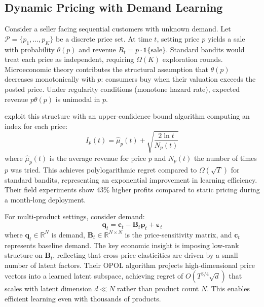 \begin{table}[htbp]
\centering

\caption{Terminal cumulative regret and fraction of plays on the optimal arm at $T = 10{,}000$ for the 10-armed Gaussian bandit. Mean $\pm$ one standard error over 30 seeds.}
\label{tab:bandit_fundamentals}
\end{table}


\subsection{Dynamic Pricing with Demand Learning}
\label{sec:dynamic_pricing}

Consider a seller facing sequential customers with unknown demand. Let $\mathcal{P} = \{p_1, \ldots, p_K\}$ be a discrete price set. At time $t$, setting price $p$ yields a sale with probability $\theta(p)$ and revenue $R_t = p \cdot \mathbb{1}\{\text{sale}\}$. Standard bandits would treat each price as independent, requiring $\Omega(K)$ exploration rounds. Microeconomic theory contributes the structural assumption that $\theta(p)$ decreases monotonically with $p$: consumers buy when their valuation exceeds the posted price. Under regularity conditions (monotone hazard rate), expected revenue $p\theta(p)$ is unimodal in $p$.

\citet{Misra2019} exploit this structure with an upper-confidence bound algorithm computing an index for each price:
\begin{equation}
I_p(t) = \hat{\mu}_p(t) + \sqrt{\frac{2\ln t}{N_p(t)}}
\end{equation}
where $\hat{\mu}_p(t)$ is the average revenue for price $p$ and $N_p(t)$ the number of times $p$ was tried. This achieves polylogarithmic regret compared to $\Omega(\sqrt{T})$ for standard bandits, representing an exponential improvement in learning efficiency. Their field experiments show 43\% higher profits compared to static pricing during a month-long deployment.

For multi-product settings, \citet{Mueller2019} consider demand:
\begin{equation}
\mathbf{q}_t = \mathbf{c}_t - \mathbf{B}_t\mathbf{p}_t + \boldsymbol{\varepsilon}_t
\end{equation}
where $\mathbf{q}_t \in \mathbb{R}^N$ is demand, $\mathbf{B}_t \in \mathbb{R}^{N \times N}$ is the price-sensitivity matrix, and $\mathbf{c}_t$ represents baseline demand. The key economic insight is imposing low-rank structure on $\mathbf{B}_t$, reflecting that cross-price elasticities are driven by a small number of latent factors. Their OPOL algorithm projects high-dimensional price vectors into a learned latent subspace, achieving regret of $O(T^{3/4}\sqrt{d})$ that scales with latent dimension $d \ll N$ rather than product count $N$. This enables efficient learning even with thousands of products.

